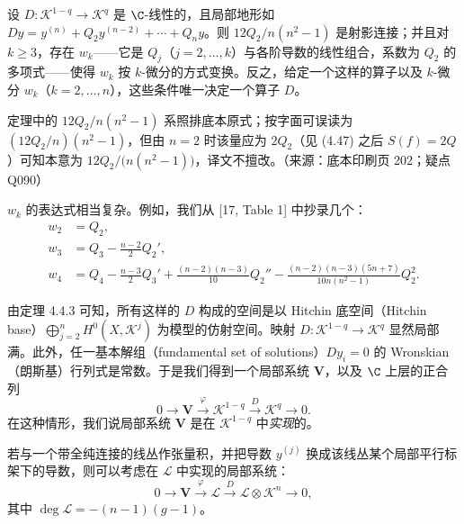 \begin{theorem}[{参见 [17]；亦见 [34, 68]}]
设 $D\colon\mathcal{K}^{1-q}\to\mathcal{K}^{q}$ 是 $\C$-线性的，且局部地形如 $Dy=y^{(n)}+Q_2y^{(n-2)}+\cdots+Q_ny$。则 $12Q_2/n(n^2-1)$ 是射影连接；并且对 $k\ge3$，存在 $w_k$——它是 $Q_j$（$j=2,\dots,k$）与各阶导数的线性组合，系数为 $Q_2$ 的多项式——使得 $w_k$ 按 $k$-微分的方式变换。反之，给定一个这样的算子以及 $k$-微分 $w_k$（$k=2,\dots,n$），这些条件唯一决定一个算子 $D$。
\end{theorem}
\begin{annote}定理中的 $12Q_2/n(n^2-1)$ 系照排底本原式；按字面可误读为 $(12Q_2/n)(n^2-1)$，但由 $n=2$ 时该量应为 $2Q_2$（见 (4.47) 之后 $S(f)=2Q$）可知本意为 $12Q_2/\bigl(n(n^2-1)\bigr)$，译文不擅改。（来源：底本印刷页 202；疑点 Q090）\end{annote}

$w_k$ 的表达式相当复杂。例如，我们从 [17, Table 1] 中抄录几个：
\begin{equation}
\begin{aligned}
w_2&=Q_2,\\
w_3&=Q_3-\frac{n-2}{2}Q_2',\\
w_4&=Q_4-\frac{n-3}{2}Q_3'+\frac{(n-2)(n-3)}{10}Q_2''
-\frac{(n-2)(n-3)(5n+7)}{10n(n^2-1)}Q_2^2.
\end{aligned}
\tag{4.51}\label{eq:4.51}
\end{equation}

由定理 4.4.3 可知，所有这样的 $D$ 构成的空间是以 Hitchin 底空间（Hitchin base）$\bigoplus_{j=2}^{n}H^0(X,\mathcal{K}^j)$ 为模型的仿射空间。映射 $D\colon\mathcal{K}^{1-q}\to\mathcal{K}^{q}$ 显然局部满。此外，任一基本解组（fundamental set of solutions）$Dy_i=0$ 的 Wronskian（朗斯基）行列式是常数。于是我们得到一个局部系统 $\mathbf{V}$，以及 $\C$ 上层的正合列
\begin{equation}
0\longrightarrow\mathbf{V}\xrightarrow{\ \varphi\ }\mathcal{K}^{1-q}\xrightarrow{\ D\ }\mathcal{K}^{q}\longrightarrow0. \tag{4.52}\label{eq:4.52}
\end{equation}
在这种情形，我们说局部系统 $\mathbf{V}$ 是在 $\mathcal{K}^{1-q}$ 中\emph{实现}的。

\begin{remark}
若与一个带全纯连接的线丛作张量积，并把导数 $y^{(j)}$ 换成该线丛某个局部平行标架下的导数，则可以考虑在 $\mathcal{L}$ 中实现的局部系统：
\begin{equation}
0\longrightarrow\mathbf{V}\xrightarrow{\ \varphi\ }\mathcal{L}\xrightarrow{\ D\ }\mathcal{L}\otimes\mathcal{K}^{n}\longrightarrow0, \tag{4.53}\label{eq:4.53}
\end{equation}
其中 $\deg\mathcal{L}=-(n-1)(g-1)$。
\end{remark}

